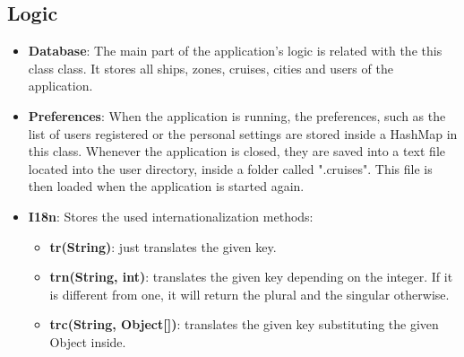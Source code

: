 \documentclass{article}
\begin{document}
   \subsection{Logic}
   \begin{itemize}
	   	\item \textbf{Database}: The main part of the application's logic is related with the this class class. It stores all ships, zones, cruises, cities and users of the application.
	   	\item \textbf{Preferences}: When the application is running, the preferences, such as the list of users registered or the personal settings are stored inside a HashMap in this class. Whenever the application is closed, they are saved into a text file located into the user directory, inside a folder called ".cruises". This file is then loaded when the application is started again.
	   	\item \textbf{I18n}: Stores the used internationalization methods:
		\begin{itemize}
			\item \textbf{tr(String)}: just translates the given key.
			\item \textbf{trn(String, int)}: translates the given key depending on the integer. If it is different from one, it will return the plural and the singular otherwise.
			\item \textbf{trc(String, Object[])}: translates the given key substituting the given Object inside.
		\end{itemize}
   \end{itemize}
\end{document}
